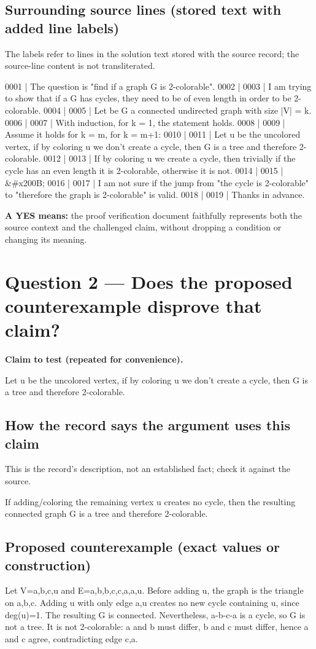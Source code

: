 \documentclass[11pt]{article}
\begin{document}
\subsection*{Surrounding source lines (stored text with added line labels)}
The labels refer to lines in the solution text stored with the source record; the source-line content is not transliterated.
\begin{Vsrc}
0001 | The question is "find if a graph G is 2-colorable".
0002 | 
0003 | I am trying to show that if a G has cycles, they need to be of even length in order to be 2-colorable.
0004 | 
0005 | Let be G a connected undirected graph with size |V| = k.
0006 | 
0007 | With induction, for k = 1, the statement holds.
0008 | 
0009 | Assume it holds for k = m, for k = m+1:
0010 | 
0011 | Let u be the uncolored vertex, if by coloring u we don't create a cycle, then G is a tree and therefore 2-colorable.
0012 | 
0013 | If by coloring u we create a cycle, then trivially if the cycle has an even length it is 2-colorable, otherwise it is not.
0014 | 
0015 | &#x200B;
0016 | 
0017 | I am not sure if the jump from "the cycle is 2-colorable" to "therefore the graph is 2-colorable" is valid.
0018 | 
0019 | Thanks in advance.
\end{Vsrc}
\textbf{A YES means:} the proof verification document faithfully represents both the source context and the challenged claim, without dropping a condition or changing its meaning.
\section*{Question 2 --- Does the proposed counterexample disprove that claim?}
\textbf{Claim to test (repeated for convenience).}
\begin{Vsrc}
Let u be the uncolored vertex, if by coloring u we don't create a cycle, then G is a tree and therefore 2-colorable.
\end{Vsrc}
\subsection*{How the record says the argument uses this claim}
This is the record's description, not an established fact; check it against the source.
\begin{Vsrc}
If adding/coloring the remaining vertex u creates no cycle, then the resulting connected graph G is a tree and therefore 2-colorable.
\end{Vsrc}
\subsection*{Proposed counterexample (exact values or construction)}
\begin{Vsrc}
Let V={a,b,c,u} and E={{a,b},{b,c},{c,a},{a,u}}. Before adding u, the graph is the triangle on {a,b,c}. Adding u with only edge {a,u} creates no new cycle containing u, since deg(u)=1. The resulting G is connected. Nevertheless, a-b-c-a is a cycle, so G is not a tree. It is not 2-colorable: a and b must differ, b and c must differ, hence a and c agree, contradicting edge {c,a}.
\end{Vsrc}
\end{document}
